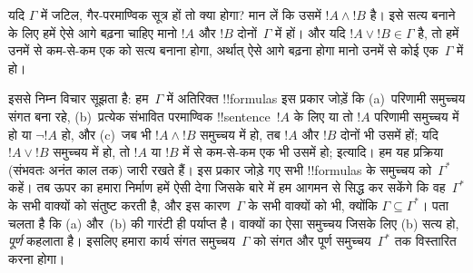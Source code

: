 \documentclass[../../../include/open-logic-section]{subfiles}
\begin{document}
यदि $\Gamma$ में जटिल, गैर-परमाण्विक सूत्र हों तो क्या होगा? मान लें कि
उसमें $!A \land !B$ है। इसे सत्य बनाने के लिए हमें ऐसे आगे बढ़ना चाहिए मानो
$!A$ और $!B$ दोनों~$\Gamma$ में हों। और यदि $!A \lor !B \in \Gamma$ है,
तो हमें उनमें से कम-से-कम एक को सत्य बनाना होगा, अर्थात् ऐसे आगे बढ़ना होगा
मानो उनमें से कोई एक~$\Gamma$ में हो।

इससे निम्न विचार सूझता है: हम~$\Gamma$ में अतिरिक्त !!{formula}s इस प्रकार
जोड़ें कि (a)~परिणामी समुच्चय संगत बना रहे, (b)~प्रत्येक संभावित परमाण्विक
!!{sentence}~$!A$ के लिए या तो $!A$ परिणामी समुच्चय में हो या $\lnot !A$ हो,
और (c)~जब भी $!A \land !B$ समुच्चय में हो, तब $!A$ और $!B$ दोनों भी उसमें
हों; यदि $!A \lor !B$ समुच्चय में हो, तो $!A$ या $!B$ में से कम-से-कम एक
भी उसमें हो; इत्यादि। हम यह प्रक्रिया (संभवतः अनंत काल तक) जारी रखते हैं।
इस प्रकार जोड़े गए सभी !!{formula}s के समुच्चय को~$\Gamma^*$ कहें। तब ऊपर
का हमारा निर्माण हमें ऐसी 
देगा जिसके बारे में हम आगमन से सिद्ध कर सकेंगे कि वह~$\Gamma^*$ के सभी
वाक्यों को संतुष्ट करती है, और इस कारण~$\Gamma$ के सभी वाक्यों को भी,
क्योंकि $\Gamma \subseteq \Gamma^*$। पता चलता है कि (a) और~(b) की गारंटी
ही पर्याप्त है। वाक्यों का ऐसा समुच्चय जिसके लिए (b) सत्य हो,
\emph{पूर्ण} कहलाता है। इसलिए हमारा कार्य संगत समुच्चय~$\Gamma$ को संगत और
पूर्ण समुच्चय~$\Gamma^*$ तक विस्तारित करना होगा।
\end{document}
